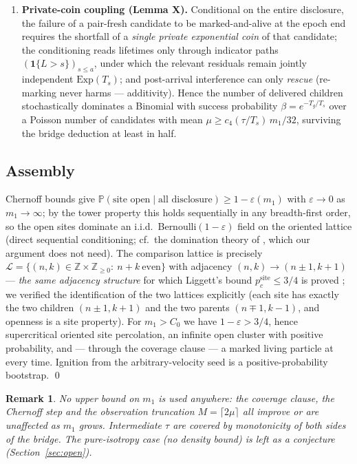 \documentclass[11pt]{article}
\newtheorem{remark}{Remark}
\newcommand{\PP}{\mathbb{P}}
\newcommand{\Ts}{T_s}
\newcommand{\Tg}{T_g}
\newcommand{\relL}{\bar\Lambda}
\begin{document}
\begin{enumerate}
$\relL_{\max}=7.8$, about twice the assumed bound.
\item \textbf{Private-coin coupling (Lemma X).} Conditional on the entire
disclosure, the failure of a pair-fresh candidate to be marked-and-alive at
the epoch end requires the shortfall of a \emph{single private exponential
coin} of that candidate; the conditioning reads lifetimes only through
indicator paths $(\mathbf{1}\{L>s\})_{s\le a}$, under which the relevant
residuals remain jointly independent $\mathrm{Exp}(\Ts)$; and post-arrival
interference can only \emph{rescue} (re-marking never harms --- additivity).
Hence the number of delivered children stochastically dominates a Binomial
with success probability $\beta=e^{-\Tg/\Ts}$ over a Poisson number
of candidates with mean $\mu\ge c_4(\tau/\Ts)\,m_1/32$, surviving the
bridge deduction at least in half.
\end{enumerate}

\subsection{Assembly}\label{sec:assembly}
Chernoff bounds give $\PP(\text{site open}\mid\text{all disclosure})\ge
1-\varepsilon(m_1)$ with $\varepsilon\to0$ as $m_1\to\infty$; by the tower
property this holds sequentially in any breadth-first order, so the open
sites dominate an i.i.d.\ Bernoulli$(1-\varepsilon)$ field on the oriented
lattice (direct sequential conditioning; cf.\ the domination theory of
\cite{lss97}, which our argument does not need). The comparison lattice is precisely
$\mathcal{L}=\{(n,k)\in\mathbb{Z}\times\mathbb{Z}_{\ge0}:\ n+k\
\text{even}\}$ with adjacency $(n,k)\to(n\pm1,k+1)$ --- \emph{the same
adjacency structure} for which Liggett's bound
$p_c^{\mathrm{site}}\le 3/4$ is proved \cite{liggett95}; we verified the
identification of the two lattices explicitly (each site has exactly the two
children $(n\pm1,k+1)$ and the two parents $(n\mp1,k-1)$, and openness is a
site property). For $m_1>C_0$ we have $1-\varepsilon>3/4$, hence
supercritical oriented site percolation, an infinite open cluster with
positive probability, and --- through the coverage clause --- a marked living
particle at every time. Ignition from the arbitrary-velocity seed is a
positive-probability bootstrap. \qed

\begin{remark}
No upper bound on $m_1$ is used anywhere: the coverage clause, the Chernoff
step and the observation truncation $M=\lceil2\mu\rceil$ all improve or are
unaffected as $m_1$ grows. Intermediate $\tau$ are covered by monotonicity
of both sides of the bridge. The pure-isotropy case (no density bound) is
left as a conjecture (Section~\ref{sec:open}).
\end{remark}
\end{document}
